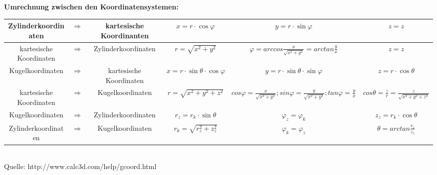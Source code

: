 \documentclass[6pt,a4paper]{scrartcl}
\begin{document}
\textbf{Umrechnung zwischen den Koordinatensystemen:}
\begin{center}
    \begin{tabular}{|ccc|c|c|c|}
        \hline
        Zylinderkoordinaten     & $\Rightarrow$ & kartesische Koordinanten & $x=r\cdot\cos\varphi$                & $y=r\cdot\sin\varphi$                                                                            & $z=z$                                                \\
        \hline
        kartesische Koordinaten & $\Rightarrow$ & Zylinderkoordinaten      & $r=\sqrt{x^2+y^2}$                   & $\varphi=arccos\frac{x}{\sqrt{x^2+y^2}}=arctan\frac{y}{x}$                                       & $z=z$                                                \\
        \hline
        Kugelkoordinaten        & $\Rightarrow$ & kartesische Koordinaten  & $x=r\cdot\sin\theta\cdot\cos\varphi$ & $y=r\cdot\sin\theta\cdot\sin\varphi$                                                             & $z=r\cdot\cos\theta$                                 \\
        \hline
        kartesische Koordinaten & $\Rightarrow$ & Kugelkoordinaten         & $r=\sqrt{x^2+y^2+z^2}$               & $cos\varphi=\frac{x}{\sqrt{x^2+y^2}};sin\varphi=\frac{y}{\sqrt{x^2+y^2}};tan\varphi=\frac{y}{x}$ & $cos\theta=\frac{z}{r}=\frac{z}{\sqrt{x^2+y^2+z^2}}$ \\
        \hline
        Kugelkoordinaten        & $\Rightarrow$ & Zylinderkoordinaten      & $r_z=r_k\cdot\sin\theta$             & $\varphi_z=\varphi_k$                                                                            & $z_z=r_k\cdot\cos\theta$                             \\
        \hline
        Zylinderkoordinaten     & $\Rightarrow$ & Kugelkoordinaten         & $r_k=\sqrt{r_z^2+z_z^2}$             & $\varphi_k=\varphi_z$                                                                            & $\theta=arctan\frac{r_z}{z_z}$                       \\
        \hline
    \end{tabular} \\
    Quelle: http://www.calc3d.com/help/gcoord.html
\end{center}


\end{document}
